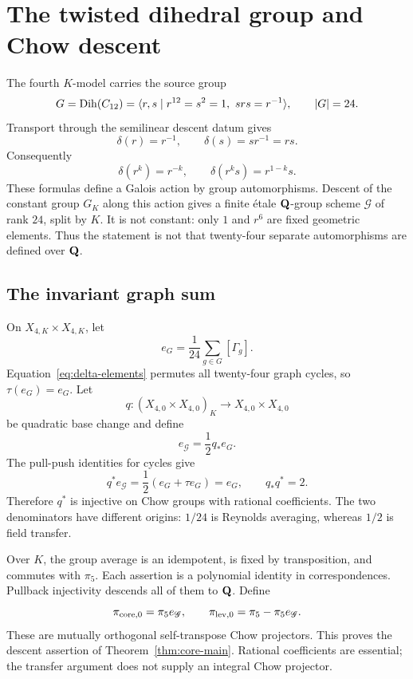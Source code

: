 \section{The twisted dihedral group and Chow descent}
\label{sec:dihedral-core}

The fourth \(K\)-model carries the source group
\[
G=\operatorname{Dih}(C_{12})
=\langle r,s\mid r^{12}=s^2=1,\ srs=r^{-1}\rangle,
\qquad |G|=24.
\]
Transport through the semilinear descent datum gives
\begin{equation}
\delta(r)=r^{-1},\qquad \delta(s)=sr^{-1}=rs.
\label{eq:delta-generators}
\end{equation}
Consequently
\begin{equation}
\delta(r^k)=r^{-k},\qquad
\delta(r^ks)=r^{1-k}s.
\label{eq:delta-elements}
\end{equation}
These formulas define a Galois action by group automorphisms.  Descent of
the constant group \(G_K\) along this action gives a finite \'etale
\(\mathbf Q\)-group scheme \(\mathscr G\) of rank \(24\), split by \(K\).
It is not constant: only \(1\) and \(r^6\) are fixed geometric elements.
Thus the statement is not that twenty-four separate automorphisms are
defined over \(\mathbf Q\).

\subsection{The invariant graph sum}

On \(X_{4,K}\times X_{4,K}\), let
\begin{equation}
e_G=\frac1{24}\sum_{g\in G}[\Gamma_g].
\label{eq:reynolds}
\end{equation}
Equation~\eqref{eq:delta-elements} permutes all twenty-four graph cycles,
so \(\tau(e_G)=e_G\).  Let
\[
q:(X_{4,0}\times X_{4,0})_K
\longrightarrow X_{4,0}\times X_{4,0}
\]
be quadratic base change and define
\begin{equation}
e_{\mathscr G}=\frac12q_*e_G.
\label{eq:transfer}
\end{equation}
The pull-push identities for cycles \cite[\S\S1.4, 1.7]{Fulton1998} give
\[
q^*e_{\mathscr G}
=\frac12(e_G+\tau e_G)=e_G,\qquad
q_*q^*=2.
\]
Therefore \(q^*\) is injective on Chow groups with rational coefficients.
The two denominators have different origins: \(1/24\) is Reynolds
averaging, whereas \(1/2\) is field transfer.

Over \(K\), the group average is an idempotent, is fixed by transposition,
and commutes with \(\pi_5\).  Each assertion is a polynomial identity in
correspondences.  Pullback injectivity descends all of them to \(\mathbf Q\).
Define
\begin{equation}
\pi_{\mathrm{core},0}=\pi_5e_{\mathscr G},\qquad
\pi_{\mathrm{lev},0}=\pi_5-\pi_5e_{\mathscr G}.
\label{eq:core-level}
\end{equation}
These are mutually orthogonal self-transpose Chow projectors.  This proves
the descent assertion of Theorem~\ref{thm:core-main}.  Rational
coefficients are essential; the transfer argument does not supply an
integral Chow projector.

